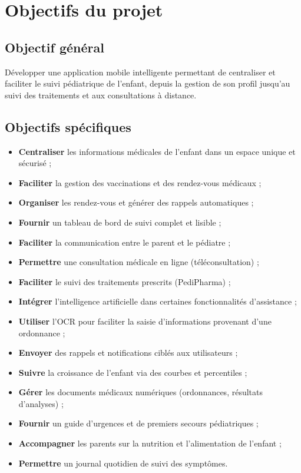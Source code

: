 \documentclass[11pt,a4paper]{article}
\begin{document}
\section{Objectifs du projet}

\subsection{Objectif général}

Développer une application mobile intelligente permettant de centraliser et faciliter le suivi pédiatrique de l'enfant, depuis la gestion de son profil jusqu'au suivi des traitements et aux consultations à distance.

\subsection{Objectifs spécifiques}

\begin{itemize}
  \item \textbf{Centraliser} les informations médicales de l'enfant dans un espace unique et sécurisé ;
  \item \textbf{Faciliter} la gestion des vaccinations et des rendez-vous médicaux ;
  \item \textbf{Organiser} les rendez-vous et générer des rappels automatiques ;
  \item \textbf{Fournir} un tableau de bord de suivi complet et lisible ;
  \item \textbf{Faciliter} la communication entre le parent et le pédiatre ;
  \item \textbf{Permettre} une consultation médicale en ligne (téléconsultation) ;
  \item \textbf{Faciliter} le suivi des traitements prescrits (PediPharma) ;
  \item \textbf{Intégrer} l'intelligence artificielle dans certaines fonctionnalités d'assistance ;
  \item \textbf{Utiliser} l'OCR pour faciliter la saisie d'informations provenant d'une ordonnance ;
  \item \textbf{Envoyer} des rappels et notifications ciblés aux utilisateurs ;
  \item \textbf{Suivre} la croissance de l'enfant via des courbes et percentiles ;
  \item \textbf{Gérer} les documents médicaux numériques (ordonnances, résultats d'analyses) ;
  \item \textbf{Fournir} un guide d'urgences et de premiers secours pédiatriques ;
  \item \textbf{Accompagner} les parents sur la nutrition et l'alimentation de l'enfant ;
  \item \textbf{Permettre} un journal quotidien de suivi des symptômes.
\end{itemize}
\end{document}
